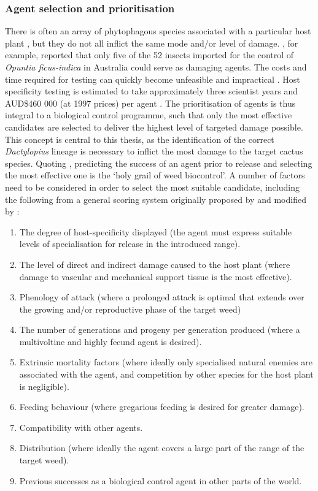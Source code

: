 \subsubsection{Agent selection and prioritisation}

There is often an array of phytophagous species associated with a particular host plant \citep{frost1954numerical, southwood1961number}, but they do not all inflict the same mode and/or level of damage. \citet{wilson1960}, for example, reported that only five of the 52 insects imported for the control of \textit{Opuntia ficus-indica} in Australia could serve as damaging agents. The costs and time required for testing can quickly become unfeasible and impractical \citep{harris1991classical, mcfadyen1998biological, paterson2014prioritisation}. Host specificity testing is estimated to take approximately three scientist years and AUD\$460 000 (at 1997 prices) per agent \citep{mcfadyen1998biological}. The prioritisation of agents is thus integral to a biological control programme, such that only the most effective candidates are selected to deliver the highest level of targeted damage possible. This concept is central to this thesis, as the identification of the correct \textit{Dactylopius} lineage is necessary to inflict the most damage to the target cactus species.  Quoting \citet{mcfadyen1998biological}, predicting the success of an agent prior to release and selecting the most effective one is the `holy grail of weed biocontrol'. A number of factors need to be considered in order to select the most suitable candidate, including the following from a general scoring system originally proposed by \citet{harris1973selection} and modified by \citet{goeden1983}:
\vspace{0.4cm}
\begin{enumerate}
    \item The degree of host-specificity displayed (the agent must express suitable levels of specialisation for release in the introduced range).
    \item The level of direct and indirect damage caused to the host plant (where damage to vascular and mechanical support tissue is the most effective).
    \item Phenology of attack (where a prolonged attack is optimal that extends over the growing and/or reproductive phase of the target weed)
    \item The number of generations and progeny per generation produced (where a multivoltine and highly fecund agent is desired).
    \item Extrinsic mortality factors (where ideally only specialised natural enemies are associated with the agent, and competition by other species for the host plant is negligible).
    \item Feeding behaviour (where gregarious feeding is desired for greater damage).
    \item Compatibility with other agents.
    \item Distribution (where ideally the agent covers a large part of the range of the target weed).
    \item Previous successes as a biological control agent in other parts of the world.
\end{enumerate} 
